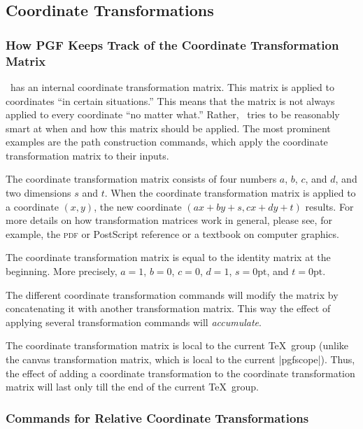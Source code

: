 \subsection{Coordinate Transformations}
\label{section-linear-coordinate-transformations}

\subsubsection{How PGF Keeps Track of the Coordinate Transformation
  Matrix}
\label{section-transform-cm}

\pgfname\ has an internal coordinate transformation matrix. This
matrix is applied to coordinates ``in certain situations.'' This means
that the matrix is not always applied to every coordinate ``no matter
what.'' Rather, \pgfname\ tries to be reasonably smart at when and how
this matrix should be applied. The most prominent examples are the
path construction commands, which apply the coordinate transformation
matrix to their inputs.

The coordinate transformation matrix consists of four numbers $a$,
$b$, $c$, and $d$, and two dimensions $s$ and $t$. When the coordinate
transformation matrix is applied to a coordinate $(x,y)$, the new
coordinate $(ax+by+s,cx+dy+t)$ results. For more details on how
transformation matrices work in general, please see, for example, the
\textsc{pdf} or PostScript reference or a textbook on computer
graphics.

The coordinate transformation matrix is equal to the identity matrix
at the beginning. More precisely, $a=1$, $b=0$, $c=0$, $d=1$,
$s=0\mathrm{pt}$, and $t=0\mathrm{pt}$.

The different coordinate transformation commands will modify the
matrix by concatenating it with another transformation matrix. This
way the effect of applying several transformation commands will
\emph{accumulate}.

The coordinate transformation matrix is local to the current \TeX\
group (unlike the canvas transformation matrix, which is local to the
current |{pgfscope}|). Thus, the effect of adding a coordinate
transformation to the coordinate transformation matrix will last only
till the end of the current \TeX\ group.




\subsubsection{Commands for Relative Coordinate Transformations}

